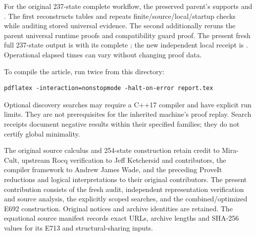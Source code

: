 For the original 237-state complete workflow, the preserved
parent's  supports
 and
.  The first reconstructs
tables and repeats finite/source/local/startup checks while
auditing stored universal evidence.  The second additionally
reruns the parent universal runtime proofs and compatibility
guard proof.  The present fresh full 237-state output is
 with its complete
; the new independent local
receipt is .
Operational elapsed times can vary without changing proof data.

To compile the article, run twice from this directory:
\begin{lstlisting}
pdflatex -interaction=nonstopmode -halt-on-error report.tex
\end{lstlisting}
Optional discovery searches may require a C++17 compiler and
have explicit run limits.  They are not prerequisites for the
inherited machine's proof replay.  Search receipts document
negative results within their specified families; they do not
certify global minimality.

The original source calculus and 254-state construction retain
credit to Mira-Cult, upstream Rocq verification to Jeff
Ketchersid and contributors, the compiler framework to Andrew
James Wade, and the preceding ProveIt reductions and logical
interpretations to their original contributors.  The present
contribution consists of the fresh audit, independent
representation verification and source analysis, the explicitly
scoped searches, and the combined/optimized E692 construction.
Original notices and archive identities are retained.  The
equational source manifest records exact URLs, archive lengths
and SHA-256 values for its E713 and structural-sharing inputs.
